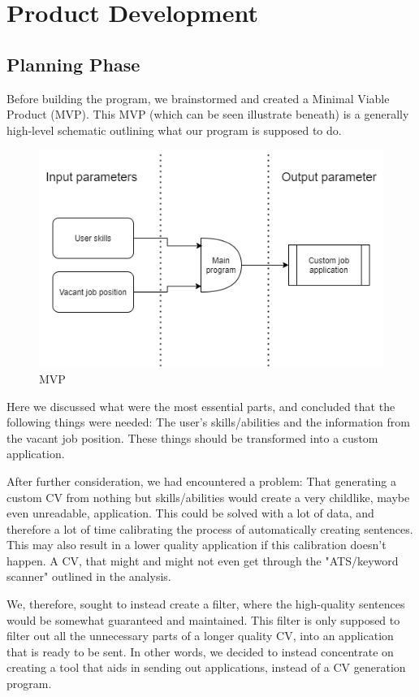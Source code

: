 \section{Product Development}\label{sec:product_development}
\subsection{Planning Phase}
Before building the program, we brainstormed and created a Minimal Viable Product (MVP).
This MVP (which can be seen illustrate beneath) is a generally high-level schematic outlining what our program is supposed to do.

\begin{figure}[H]
  \centering
  \includegraphics[scale = 0.6]{figures/engMVP}
  \caption{MVP}
\end{figure}
Here we discussed what were the most essential parts, and concluded that the following things
were needed: The user's skills/abilities and the information from the vacant job position. These things
should be transformed into a custom application. 

After further consideration, we had encountered a problem: That generating a custom CV from nothing but
skills/abilities would create a very childlike, maybe even unreadable, application. This could be solved with a lot
of data, and therefore a lot of time calibrating the process of automatically creating sentences. This may also result
in a lower quality application if this calibration doesn't happen. 
A CV, that might and might not even get through the "ATS/keyword scanner" outlined in the analysis. 

We, therefore, sought to instead create a filter, where the high-quality sentences would be somewhat guaranteed and maintained.
This filter is only supposed to filter out all the unnecessary parts of a longer quality CV, into an application that
is ready to be sent. In other words, we decided to instead concentrate on creating a tool that aids
in sending out applications, instead of a CV generation program.

